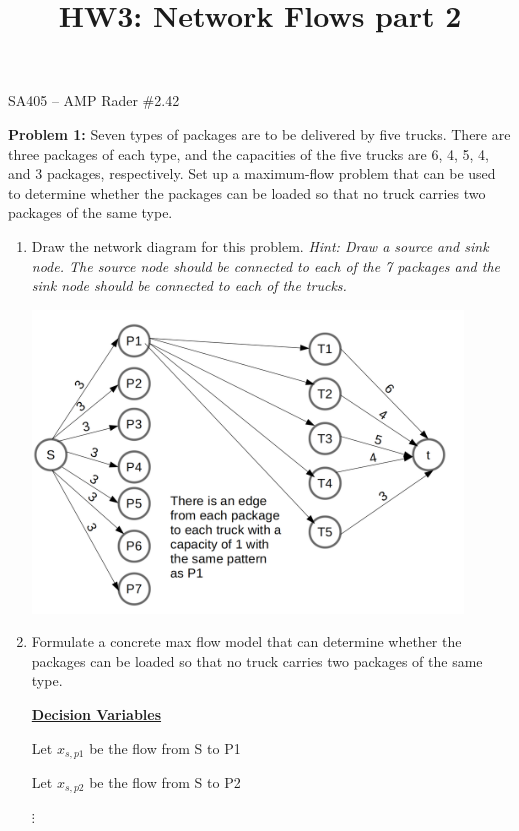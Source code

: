 \documentclass[11pt]{article}
\makeatletter
\theoremstyle{definition}
\newcommand{\blu}{\color{blue}}
\renewcommand{\maketitle}{
  \noindent SA405 -- AMP \hfill Rader \#2.42 \\

  \begin{center}\Large{\textbf{\@title}}\end{center}
}
\makeatother
\begin{document}
  
\title{HW3: Network Flows part 2}


\maketitle

\textbf{Problem 1:} Seven types of packages are to be delivered by five trucks. There are three packages of each type, and the capacities of the five trucks are 6, 4, 5, 4, and 3 packages, respectively. Set up a maximum-flow problem that can be used to determine whether the packages can be loaded so that no truck carries two packages of the same type. 

\begin{enumerate}
\item Draw the network diagram for this problem. \emph{Hint: Draw a source and sink node. The source node should be connected to each of the 7 packages and the sink node should be connected to each of the trucks.}

\begin{center}
\includegraphics[width=0.9\textwidth]{Prob1.png}
\end{center}

\newpage

\item Formulate a concrete max flow model that can determine whether the packages can be loaded so that no truck carries two packages of the same type.

{\blu
\textbf{\underline{Decision Variables}}

Let $x_{s,p1}$ be the flow from S to P1

Let $x_{s,p2}$ be the flow from S to P2

$\vdots$

}
\end{enumerate}
\end{document}
